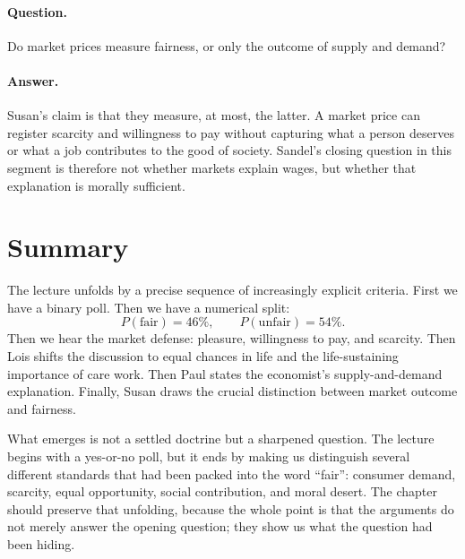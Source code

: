 \paragraph{Question.} Do market prices measure fairness, or only the outcome of supply and demand?

\paragraph{Answer.} Susan's claim is that they measure, at most, the latter. A market price can register scarcity and willingness to pay without capturing what a person deserves or what a job contributes to the good of society. Sandel's closing question in this segment is therefore not whether markets explain wages, but whether that explanation is morally sufficient.

\section{Summary}

The lecture unfolds by a precise sequence of increasingly explicit criteria. First we have a binary poll. Then we have a numerical split:
\begin{equation}
P(\text{fair}) = 46\%, \qquad P(\text{unfair}) = 54\%.
\end{equation}
Then we hear the market defense: pleasure, willingness to pay, and scarcity. Then Lois shifts the discussion to equal chances in life and the life-sustaining importance of care work. Then Paul states the economist's supply-and-demand explanation. Finally, Susan draws the crucial distinction between market outcome and fairness.

What emerges is not a settled doctrine but a sharpened question. The lecture begins with a yes-or-no poll, but it ends by making us distinguish several different standards that had been packed into the word ``fair'': consumer demand, scarcity, equal opportunity, social contribution, and moral desert. The chapter should preserve that unfolding, because the whole point is that the arguments do not merely answer the opening question; they show us what the question had been hiding.